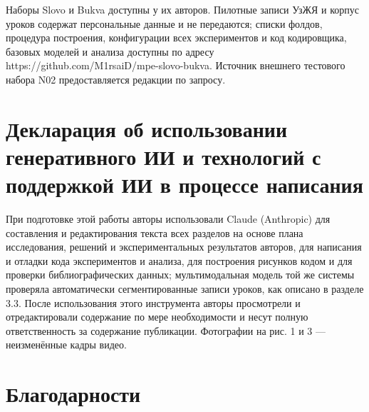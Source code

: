 \documentclass[a4paper,fleqn]{cas-dc}
\begin{document}
Наборы Slovo и Bukva доступны у их авторов. Пилотные записи УзЖЯ и корпус уроков содержат персональные данные и не передаются; списки фолдов, процедура построения, конфигурации всех экспериментов и код кодировщика, базовых моделей и анализа доступны по адресу https://github.com/M1rsaiD/mpe-slovo-bukva. Источник внешнего тестового набора N02 предоставляется редакции по запросу.

\hypertarget{ux434ux435ux43aux43bux430ux440ux430ux446ux438ux44f-ux43eux431-ux438ux441ux43fux43eux43bux44cux437ux43eux432ux430ux43dux438ux438-ux433ux435ux43dux435ux440ux430ux442ux438ux432ux43dux43eux433ux43e-ux438ux438-ux438-ux442ux435ux445ux43dux43eux43bux43eux433ux438ux439-ux441-ux43fux43eux434ux434ux435ux440ux436ux43aux43eux439-ux438ux438-ux432-ux43fux440ux43eux446ux435ux441ux441ux435-ux43dux430ux43fux438ux441ux430ux43dux438ux44f}{%
\section*{Декларация об использовании генеративного ИИ и технологий с поддержкой ИИ в процессе написания}\label{ux434ux435ux43aux43bux430ux440ux430ux446ux438ux44f-ux43eux431-ux438ux441ux43fux43eux43bux44cux437ux43eux432ux430ux43dux438ux438-ux433ux435ux43dux435ux440ux430ux442ux438ux432ux43dux43eux433ux43e-ux438ux438-ux438-ux442ux435ux445ux43dux43eux43bux43eux433ux438ux439-ux441-ux43fux43eux434ux434ux435ux440ux436ux43aux43eux439-ux438ux438-ux432-ux43fux440ux43eux446ux435ux441ux441ux435-ux43dux430ux43fux438ux441ux430ux43dux438ux44f}}

При подготовке этой работы авторы использовали Claude (Anthropic) \cite{2026_anthropic_claude} для составления и редактирования текста всех разделов на основе плана исследования, решений и экспериментальных результатов авторов, для написания и отладки кода экспериментов и анализа, для построения рисунков кодом и для проверки библиографических данных; мультимодальная модель той же системы проверяла автоматически сегментированные записи уроков, как описано в разделе 3.3. После использования этого инструмента авторы просмотрели и отредактировали содержание по мере необходимости и несут полную ответственность за содержание публикации. Фотографии на рис. 1 и 3 --- неизменённые кадры видео.

\hypertarget{ux431ux43bux430ux433ux43eux434ux430ux440ux43dux43eux441ux442ux438}{%
\section*{Благодарности}\label{ux431ux43bux430ux433ux43eux434ux430ux440ux43dux43eux441ux442ux438}}
\end{document}
